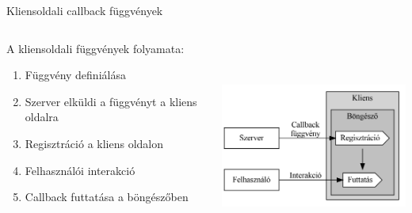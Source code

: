 \documentclass[english, aspectratio=169]{beamer}
\begin{document}
	\begin{frame}{Kliensoldali callback függvények}
		\begin{columns}
			\begin{column}{.5\textwidth}
				A kliensoldali függvények folyamata: 
				\begin{enumerate}
					\item Függvény definiálása
					\item Szerver elküldi a függvényt a kliens oldalra
					\item Regisztráció a kliens oldalon 
					\item Felhasználói interakció
					\item Callback futtatása a böngészőben
				\end{enumerate}
			\end{column}
			\begin{column}{.5\textwidth}
				\begin{center}
					\includegraphics[width=7cm, height=7cm, keepaspectratio]{graphs/adv_2.png}
				\end{center}	
			\end{column}
		\end{columns}
	\end{frame}
	
\end{document}
